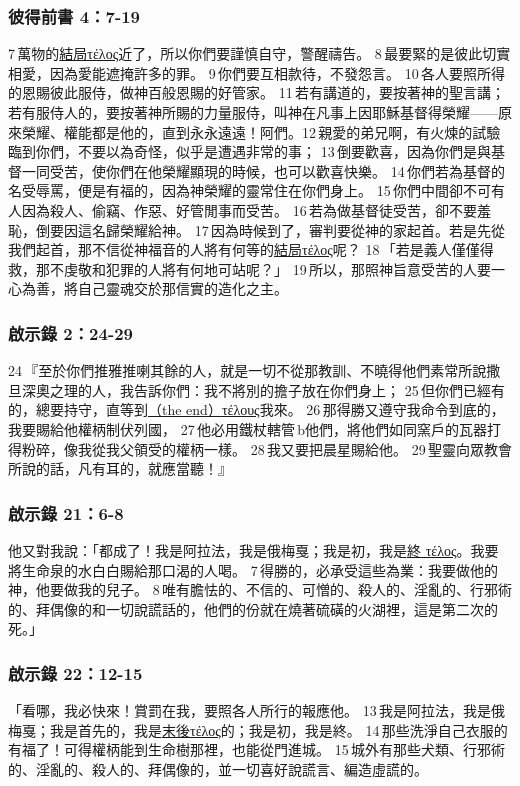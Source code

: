 \subsubsection{彼得前書 4：7-19}
7 萬物的\underline{結局τέλος}近了，所以你們要謹慎自守，警醒禱告。 8 最要緊的是彼此切實相愛，因為愛能遮掩許多的罪。 9 你們要互相款待，不發怨言。 10 各人要照所得的恩賜彼此服侍，做神百般恩賜的好管家。 11 若有講道的，要按著神的聖言講；若有服侍人的，要按著神所賜的力量服侍，叫神在凡事上因耶穌基督得榮耀——原來榮耀、權能都是他的，直到永永遠遠！阿們。12 親愛的弟兄啊，有火煉的試驗臨到你們，不要以為奇怪，似乎是遭遇非常的事； 13 倒要歡喜，因為你們是與基督一同受苦，使你們在他榮耀顯現的時候，也可以歡喜快樂。 14 你們若為基督的名受辱罵，便是有福的，因為神榮耀的靈常住在你們身上。 15 你們中間卻不可有人因為殺人、偷竊、作惡、好管閒事而受苦。 16 若為做基督徒受苦，卻不要羞恥，倒要因這名歸榮耀給神。 17 因為時候到了，審判要從神的家起首。若是先從我們起首，那不信從神福音的人將有何等的\underline{結局τέλος}呢？ 18 「若是義人僅僅得救，那不虔敬和犯罪的人將有何地可站呢？」 19 所以，那照神旨意受苦的人要一心為善，將自己靈魂交於那信實的造化之主。

\subsubsection{啟示錄 2：24-29}

24 『至於你們推雅推喇其餘的人，就是一切不從那教訓、不曉得他們素常所說撒旦深奧之理的人，我告訴你們：我不將別的擔子放在你們身上； 25 但你們已經有的，總要持守，直等到\underline{（the end）τέλους}我來。 26 那得勝又遵守我命令到底的，我要賜給他權柄制伏列國， 27 他必用鐵杖轄管 b他們，將他們如同窯戶的瓦器打得粉碎，像我從我父領受的權柄一樣。 28 我又要把晨星賜給他。 29 聖靈向眾教會所說的話，凡有耳的，就應當聽！』

\subsubsection{啟示錄 21：6-8}
他又對我說：「都成了！我是阿拉法，我是俄梅戛；我是初，我是\underline{終 τέλος}。我要將生命泉的水白白賜給那口渴的人喝。 7 得勝的，必承受這些為業：我要做他的神，他要做我的兒子。 8 唯有膽怯的、不信的、可憎的、殺人的、淫亂的、行邪術的、拜偶像的和一切說謊話的，他們的份就在燒著硫磺的火湖裡，這是第二次的死。」

\subsubsection{啟示錄 22：12-15}
「看哪，我必快來！賞罰在我，要照各人所行的報應他。 13 我是阿拉法，我是俄梅戛；我是首先的，我是\underline{末後τέλος}的；我是初，我是終。 14 那些洗淨自己衣服的有福了！可得權柄能到生命樹那裡，也能從門進城。 15 城外有那些犬類、行邪術的、淫亂的、殺人的、拜偶像的，並一切喜好說謊言、編造虛謊的。











